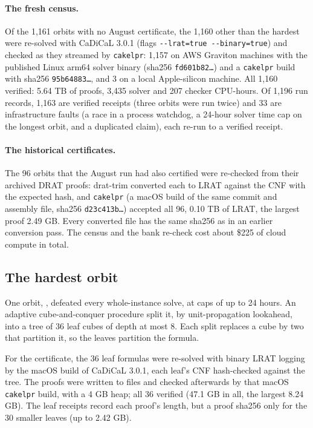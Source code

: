 \documentclass{anvil-paper}
\newcommand{\cakelpr}{\texttt{cake\textunderscore lpr}}
\theoremstyle{definition}
\begin{document}
\paragraph{The fresh census.} Of the 1,161 orbits with no August certificate, the 1,160 other than the hardest were re-solved with CaDiCaL 3.0.1 (flags \texttt{-{}-lrat=true -{}-binary=true}) and checked as they streamed by \cakelpr{}: 1,157 on AWS Graviton machines with the published Linux arm64 solver binary (sha256 \texttt{fd601b82\ldots}) and a \cakelpr{} build with sha256 \texttt{95b64883\ldots}, and 3 on a local Apple-silicon machine. All 1,160 verified: 5.64 TB of proofs, 3,435 solver and 207 checker CPU-hours. Of 1,196 run records, 1,163 are verified receipts (three orbits were run twice) and 33 are infrastructure faults (a race in a process watchdog, a 24-hour solver time cap on the longest orbit, and a duplicated claim), each re-run to a verified receipt.

\paragraph{The historical certificates.} The 96 orbits that the August run had also certified were re-checked from their archived DRAT proofs: drat-trim converted each to LRAT against the CNF with the expected hash, and \cakelpr{} (a macOS build of the same commit and assembly file, sha256 \texttt{d23c413b\ldots}) accepted all 96, 0.10 TB of LRAT, the largest proof 2.49 GB. Every converted file has the same sha256 as in an earlier conversion pass. The census and the bank re-check cost about \$225 of cloud compute in total.

\subsection{The hardest orbit}\label{sec:cube}

One orbit, , defeated every whole-instance solve, at caps of up to 24 hours. An adaptive cube-and-conquer procedure split it, by unit-propagation lookahead, into a tree of 36 leaf cubes of depth at most 8. Each split replaces a cube by two that partition it, so the leaves partition the formula.

For the certificate, the 36 leaf formulas were re-solved with binary LRAT logging by the macOS build of CaDiCaL 3.0.1, each leaf's CNF hash-checked against the tree. The proofs were written to files and checked afterwards by that macOS \cakelpr{} build, with a 4 GB heap; all 36 verified (47.1 GB in all, the largest 8.24 GB). The leaf receipts record each proof's length, but a proof sha256 only for the 30 smaller leaves (up to 2.42 GB).
\end{document}
